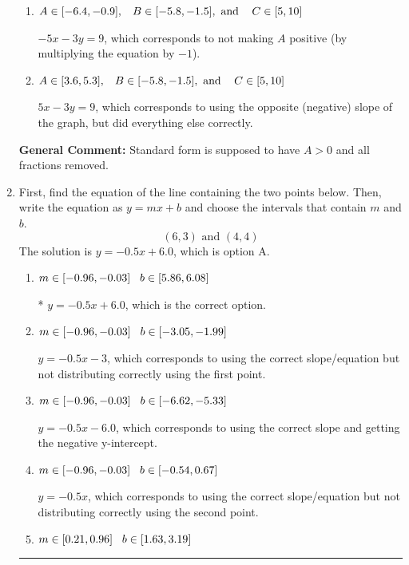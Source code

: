 \documentclass{extbook}[14pt]
\newcommand{\litem}[1]{\item #1

\rule{\textwidth}{0.4pt}}
\begin{document}
\begin{enumerate}
{\begin{enumerate}[label=\Alph*.]
 $1.667x + 1y = -3.0$, which corresponds to not removing rational values for Standard Form.
\item \( A \in [-6.4, -0.9], \hspace{3mm} B \in [-5.8, -1.5], \text{ and } \hspace{3mm} C \in [5, 10] \)

 $-5x - 3y = 9$, which corresponds to not making $A$ positive (by multiplying the equation by $-1$).
\item \( A \in [3.6, 5.3], \hspace{3mm} B \in [-5.8, -1.5], \text{ and } \hspace{3mm} C \in [5, 10] \)

 $5x - 3y = 9$, which corresponds to using the opposite (negative) slope of the graph, but did everything else correctly.
\end{enumerate}

\textbf{General Comment:} Standard form is supposed to have $A > 0$ and all fractions removed.
}
\litem{
First, find the equation of the line containing the two points below. Then, write the equation as $ y=mx+b $ and choose the intervals that contain $m$ and $b$.
\[ (6, 3) \text{ and } (4, 4) \]
The solution is \( y = -0.5x + 6.0 \), which is option A.\begin{enumerate}[label=\Alph*.]
\item \( m \in [-0.96, -0.03] \hspace*{3mm} b \in [5.86, 6.08] \)

* $y = -0.5x + 6.0$, which is the correct option.
\item \( m \in [-0.96, -0.03] \hspace*{3mm} b \in [-3.05, -1.99] \)

 $y = -0.5x -3$, which corresponds to using the correct slope/equation but not distributing correctly using the first point.
\item \( m \in [-0.96, -0.03] \hspace*{3mm} b \in [-6.62, -5.33] \)

 $y = -0.5x -6.0$, which corresponds to using the correct slope and getting the negative y-intercept.
\item \( m \in [-0.96, -0.03] \hspace*{3mm} b \in [-0.54, 0.67] \)

 $y = -0.5x$, which corresponds to using the correct slope/equation but not distributing correctly using the second point.
\item \( m \in [0.21, 0.96] \hspace*{3mm} b \in [1.63, 3.19] \)


\end{enumerate}}
\end{enumerate}
\end{document}
